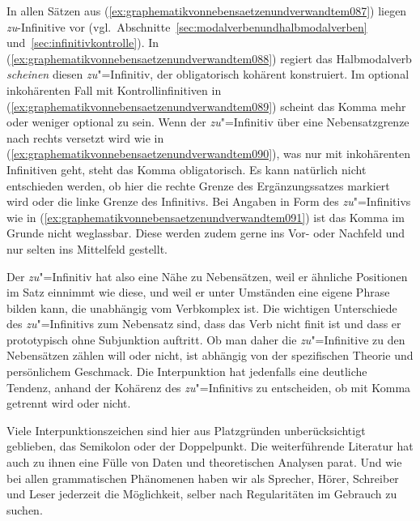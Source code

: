 In allen Sätzen aus (\ref{ex:graphematikvonnebensaetzenundverwandtem087}) liegen \textit{zu}-Infinitive vor (vgl.\ Abschnitte~\ref{sec:modalverbenundhalbmodalverben} und~\ref{sec:infinitivkontrolle}).
In (\ref{ex:graphematikvonnebensaetzenundverwandtem088}) regiert das Halbmodalverb \textit{scheinen} diesen \textit{zu}"=Infinitiv, der obligatorisch kohärent konstruiert.
Im optional inkohärenten Fall mit Kontrollinfinitiven in (\ref{ex:graphematikvonnebensaetzenundverwandtem089}) scheint das Komma mehr oder weniger optional zu sein.
Wenn der \textit{zu}"=Infinitiv über eine Nebensatzgrenze nach rechts versetzt wird wie in (\ref{ex:graphematikvonnebensaetzenundverwandtem090}), was nur mit inkohärenten Infinitiven geht, steht das Komma obligatorisch.
Es kann natürlich nicht entschieden werden, ob hier die rechte Grenze des Ergänzungssatzes markiert wird oder die linke Grenze des Infinitivs.
Bei Angaben in Form des \textit{zu}"=Infinitivs wie in (\ref{ex:graphematikvonnebensaetzenundverwandtem091}) ist das Komma im Grunde nicht weglassbar.
Diese werden zudem gerne ins Vor- oder Nachfeld und nur selten ins Mittelfeld gestellt.

Der \textit{zu}"=Infinitiv hat also eine Nähe zu Nebensätzen, weil er ähnliche Positionen im Satz einnimmt wie diese, und weil er unter Umständen eine eigene Phrase bilden kann, die unabhängig vom Verbkomplex ist.
Die wichtigen Unterschiede des \textit{zu}"=Infinitivs zum Nebensatz sind, dass das Verb nicht finit ist und dass er prototypisch ohne Subjunktion auftritt.
Ob man daher die \textit{zu}"=Infinitive zu den Nebensätzen zählen will oder nicht, ist abhängig von der spezifischen Theorie und persönlichem Geschmack.
Die Interpunktion hat jedenfalls eine deutliche Tendenz, anhand der Kohärenz des \textit{zu}"=Infinitivs zu entscheiden, ob mit Komma getrennt wird oder nicht.

Viele Interpunktionszeichen sind hier aus Platzgründen unberücksichtigt geblieben, \zB das Semikolon oder der Doppelpunkt.
Die weiterführende Literatur hat auch zu ihnen eine Fülle von Daten und theoretischen Analysen parat.
Und wie bei allen grammatischen Phänomenen haben wir als Sprecher, Hörer, Schreiber und Leser jederzeit die Möglichkeit, selber nach Regularitäten im Gebrauch zu suchen.


